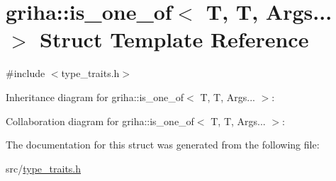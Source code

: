 \hypertarget{structgriha_1_1is__one__of_3_01_t_00_01_t_00_01_args_8_8_8_01_4}{}\section{griha\+:\+:is\+\_\+one\+\_\+of$<$ T, T, Args... $>$ Struct Template Reference}
\label{structgriha_1_1is__one__of_3_01_t_00_01_t_00_01_args_8_8_8_01_4}


{\ttfamily \#include $<$type\+\_\+traits.\+h$>$}



Inheritance diagram for griha\+:\+:is\+\_\+one\+\_\+of$<$ T, T, Args... $>$\+:


Collaboration diagram for griha\+:\+:is\+\_\+one\+\_\+of$<$ T, T, Args... $>$\+:


The documentation for this struct was generated from the following file\+:\begin{DoxyCompactItemize}
\item 
src/\hyperlink{type__traits_8h}{type\+\_\+traits.\+h}\end{DoxyCompactItemize}
